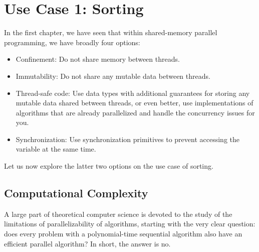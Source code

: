 \chapter{Use Case 1: Sorting}

In the first chapter, we have seen that within shared-memory parallel programming, we have broadly four options:
\begin{itemize}
\item Confinement: Do not share memory between threads. 
\item Immutability: Do not share any mutable data between threads. 
\item Thread-safe code: Use data types with additional guarantees for storing any mutable data shared between threads, or even better, use implementations of algorithms that are already parallelized and handle the concurrency issues for you. 
\item Synchronization: Use synchronization primitives to prevent accessing the variable at the same time. 
\end{itemize}

Let us now explore the latter two options on the use case of sorting. 

\section{Computational Complexity}

A large part of theoretical computer science is devoted to the study of the limitations of parallelizability of algorithms, starting with the very clear question: does every problem 
with a polynomial-time sequential algorithm also have an efficient parallel algorithm? In short, the answer is no. 

